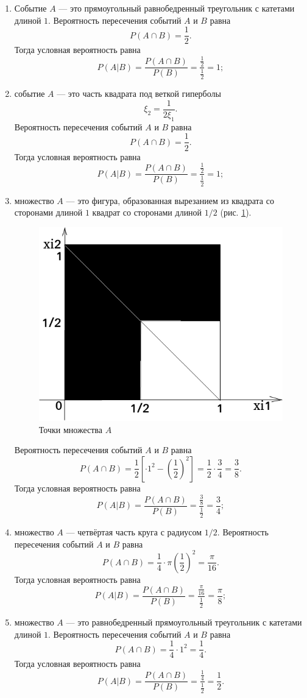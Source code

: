 \begin{enumerate}[label=\alph*)]
\item Событие $A$ --- это прямоугольный равнобедренный треугольник с катетами длиной $1$.
Вероятность пересечения событий $A$ и $B$ равна
$$P \left( A \cap B \right) =
\frac{1}{2}.$$
Тогда условная вероятность равна
$$P \left( \left. A \right| B \right) =
\frac{P \left( A \cap B \right) }{P \left( B \right) } =
\frac{ \frac{1}{2} }{ \frac{1}{2} } =
1;$$
\item событие $A$ --- это часть квадрата под веткой гиперболы
$$ \xi_2 = \frac{1}{2 \xi_1}.$$
Вероятность пересечения событий $A$ и $B$ равна
$$P \left( A \cap B \right) =
\frac{1}{2}.$$
Тогда условная вероятность равна
$$P \left( \left. A \right| B \right) =
\frac{P \left( A \cap B \right) }{P \left( B \right) } =
\frac{ \frac{1}{2} }{ \frac{1}{2} } =
1;$$
\item множество $A$ --- это фигура,
образованная вырезанием из квадрата со сторонами длиной $1$ квадрат со сторонами длиной $1/2$ (рис. \ref{fig:517}).
\begin{figure}[h!]
  \centering
  \includegraphics[width=.4\textwidth]{./pictures/5_17.png}
  \caption{Точки множества $A$}
  \label{fig:517}
\end{figure}
Вероятность пересечения событий $A$ и $B$ равна
$$P \left( A \cap B \right) =
\frac{1}{2} \left[ \cdot 1^2 - \left( \frac{1}{2} \right)^2 \right] =
\frac{1}{2} \cdot \frac{3}{4} =
\frac{3}{8}.$$
Тогда условная вероятность равна
$$P \left( \left. A \right| B \right) =
\frac{P \left( A \cap B \right) }{P \left( B \right) } =
\frac{ \frac{3}{8} }{ \frac{1}{2} } =
\frac{3}{4};$$
\item множество $A$ --- четвёртая часть круга с радиусом $1/2$.
Вероятность пересечения событий $A$ и $B$ равна
$$P \left( A \cap B \right) =
\frac{1}{4} \cdot \pi \left( \frac{1}{2} \right)^2 =
\frac{ \pi }{16}.$$
Тогда условная вероятность равна
$$P \left( \left. A \right| B \right) =
\frac{P \left( A \cap B \right) }{P \left( B \right) } =
\frac{ \frac{ \pi }{16} }{ \frac{1}{2} } =
\frac{ \pi }{8};$$
\item множество $A$ --- это равнобедренный прямоугольный треугольник с катетами длиной $1$.
Вероятность пересечения событий $A$ и $B$ равна
$$P \left( A \cap B \right) =
\frac{1}{4} \cdot 1^2 =
\frac{1}{4}.$$
Тогда условная вероятность равна
$$P \left( \left. A \right| B \right) =
\frac{P \left( A \cap B \right) }{P \left( B \right) } =
\frac{ \frac{1}{4} }{ \frac{1}{2} } =
\frac{1}{2}.$$
\end{enumerate}

